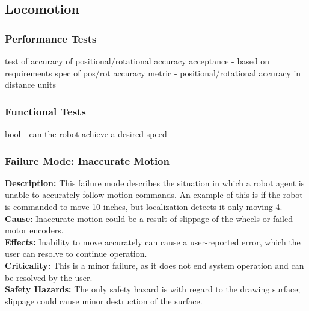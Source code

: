 
\subsection{Locomotion}
\label{sec:verification_locomotion}

\subsubsection{Performance Tests}
\label{sec:locomotion_pt}

test of accuracy of positional/rotational accuracy
acceptance - based on requirements spec of pos/rot accuracy
metric - positional/rotational accuracy in distance units

\subsubsection{Functional Tests}
\label{sec:locomotion_ft}

bool - can the robot achieve a desired speed



\subsubsection{Failure Mode: Inaccurate Motion}
\label{sec:locomotion_fm_motion}
\textbf{Description:} This failure mode describes the situation in which a robot agent is unable to accurately follow motion commands. An example of this is if the robot is commanded to move 10 inches, but localization detects it only moving 4.\\
\textbf{Cause:} Inaccurate motion could be a result of slippage of the wheels or failed motor encoders.\\
\textbf{Effects:} Inability to move accurately can cause a user-reported error, which the user can resolve to continue operation. \\
\textbf{Criticality:}  This is a minor failure, as it does not end system operation and can be resolved by the user.\\
\textbf{Safety Hazards:} The only safety hazard is with regard to the drawing surface; slippage could cause minor destruction of the surface.\\

